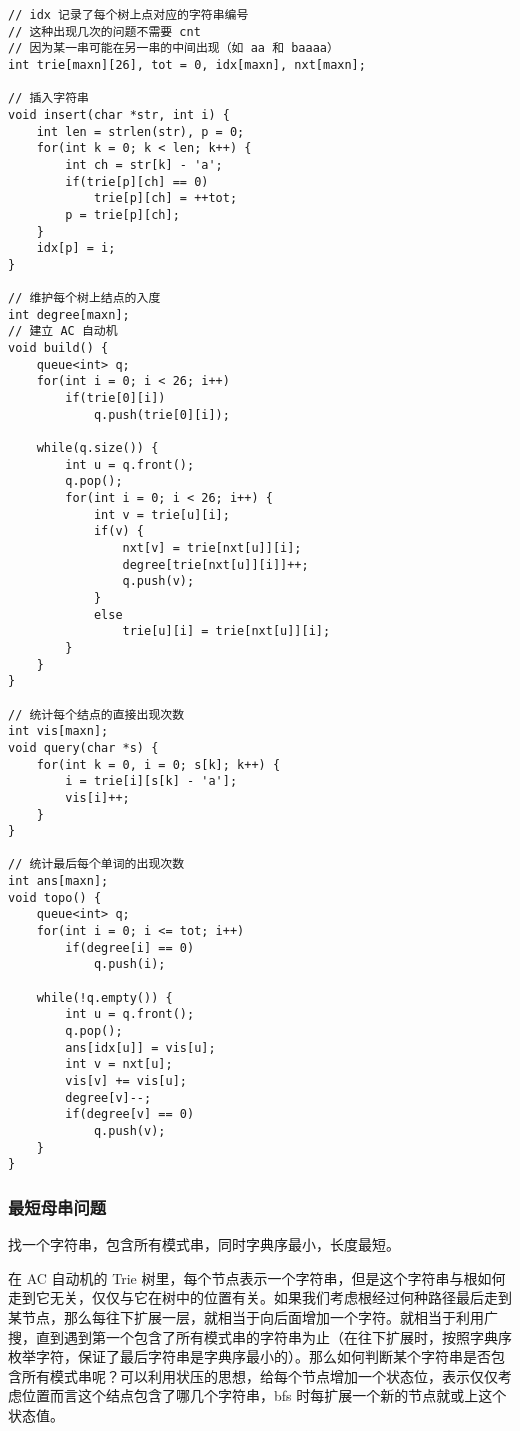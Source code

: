 \documentclass[UTF8]{article}
\begin{document}
\begin{lstlisting}[caption=AC 自动机的拓扑排序优化]
// idx 记录了每个树上点对应的字符串编号
// 这种出现几次的问题不需要 cnt
// 因为某一串可能在另一串的中间出现（如 aa 和 baaaa）
int trie[maxn][26], tot = 0, idx[maxn], nxt[maxn];

// 插入字符串
void insert(char *str, int i) {
	int len = strlen(str), p = 0;
	for(int k = 0; k < len; k++) {
		int ch = str[k] - 'a';
		if(trie[p][ch] == 0)
			trie[p][ch] = ++tot;
		p = trie[p][ch];
	}
	idx[p] = i;
}

// 维护每个树上结点的入度
int degree[maxn];
// 建立 AC 自动机
void build() {
    queue<int> q;
    for(int i = 0; i < 26; i++)
        if(trie[0][i])
            q.push(trie[0][i]);
    
    while(q.size()) {
        int u = q.front();
        q.pop();
        for(int i = 0; i < 26; i++) {
            int v = trie[u][i];
            if(v) {
                nxt[v] = trie[nxt[u]][i];
                degree[trie[nxt[u]][i]]++;
                q.push(v);
            }
            else
                trie[u][i] = trie[nxt[u]][i];
        }
    }
}

// 统计每个结点的直接出现次数
int vis[maxn];
void query(char *s) {
    for(int k = 0, i = 0; s[k]; k++) {
        i = trie[i][s[k] - 'a'];
        vis[i]++;
    }
}

// 统计最后每个单词的出现次数
int ans[maxn];
void topo() {
    queue<int> q;
    for(int i = 0; i <= tot; i++)
        if(degree[i] == 0)
            q.push(i);
    
    while(!q.empty()) {
        int u = q.front();
        q.pop();
        ans[idx[u]] = vis[u];
        int v = nxt[u];
        vis[v] += vis[u];
        degree[v]--;
        if(degree[v] == 0)
            q.push(v);
    }
}
\end{lstlisting}


\subsubsection{最短母串问题}
找一个字符串，包含所有模式串，同时字典序最小，长度最短。

在 AC 自动机的 Trie 树里，每个节点表示一个字符串，但是这个字符串与根如何走到它无关，仅仅与它在树中的位置有关。如果我们考虑根经过何种路径最后走到某节点，那么每往下扩展一层，就相当于向后面增加一个字符。就相当于利用广搜，直到遇到第一个包含了所有模式串的字符串为止（在往下扩展时，按照字典序枚举字符，保证了最后字符串是字典序最小的）。那么如何判断某个字符串是否包含所有模式串呢？可以利用状压的思想，给每个节点增加一个状态位，表示仅仅考虑位置而言这个结点包含了哪几个字符串，bfs 时每扩展一个新的节点就或上这个状态值。
\end{document}
